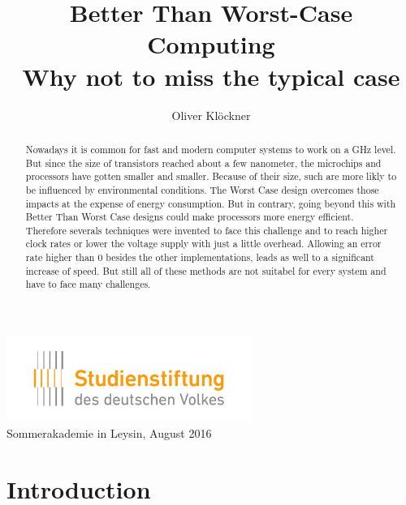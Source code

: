 \documentclass[12pt, a4paper]{article}
\begin{document}
	
	\title{%
		{\bfseries Better Than Worst-Case Computing }\\[1ex] %
		{\large\bfseries Why not to miss the typical case} %
	}
	\author{Oliver Klöckner} %
	
	\date{\vspace{-5ex}} %
	
	{\sf \maketitle} %
	
	\begin{center}
		\includegraphics[width=8cm]{logo_sdv.pdf}\\
		{\large\sf Sommerakademie in Leysin, August 2016}
	\end{center}
	
	\vspace{1cm}
	
	\begin{abstract}
	Nowadays it is common for fast and modern computer systems to work on a GHz level. But since the size of transistors reached about a few nanometer, the microchips and processors have gotten smaller and smaller. Because of their size, such are more likly to be influenced by environmental conditions. The Worst Case design overcomes those impacts at the expense of energy consumption. But in contrary, going beyond this with Better Than Worst Case designs could make processors more energy efficient. Therefore severals techniques were invented to face this challenge and to reach higher clock rates or lower the voltage supply with just a little overhead. Allowing an error rate higher than 0 besides the other implementations, leads as well to a significant increase of speed. But still all of these methods are not suitabel for every system and have to face many challenges. 
	\end{abstract}
	
	\newpage
	\tableofcontents
	
	\newpage
	\section{Introduction}\label{sec:introduction}
	
\end{document}
